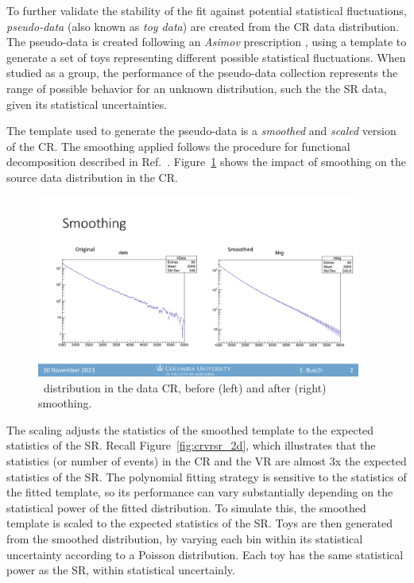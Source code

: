 To further validate the stability of the fit against potential statistical fluctuations, \textit{pseudo-data} (also known as \textit{toy data}) are created from the CR data distribution. 
The pseudo-data is created following an \textit{Asimov} prescription \cite{asimov}, using a template to generate a set of toys representing different possible statistical fluctuations.
When studied as a group, the performance of the pseudo-data collection represents the range of possible behavior for an unknown distribution, such the the SR data, given its statistical uncertainties.

The template used to generate the pseudo-data is a \textit{smoothed} and \textit{scaled} version of the CR. 
The smoothing applied follows the procedure for functional decomposition described in Ref.~\cite{edgar2018functional}.
Figure~\ref{fig:smoothing} shows the impact of smoothing on the source data distribution in the CR.
\begin{figure}[!htbp]
\centering
   \includegraphics[width=0.95\textwidth]{figures/stats/smoothing}
    \caption{\mt~distribution in the data CR, before (left) and after (right) smoothing.
    \label{fig:smoothing}}
\end{figure}

The scaling adjusts the statistics of the smoothed template to the expected statistics of the SR.
Recall Figure~\ref{fig:crvrsr_2d}, which illustrates that the statistics (or number of events) in the CR and the VR are almost 3x the expected statistics of the SR.
The polynomial fitting strategy is sensitive to the statistics of the fitted template, so its performance can vary substantially depending on the statistical power of the fitted distribution.
To simulate this, the smoothed template is scaled to the expected statistics of the SR.
Toys are then generated from the smoothed distribution, by varying each bin within its statistical uncertainty according to a Poisson distribution. 
Each toy has the same statistical power as the SR, within statistical uncertainly.

